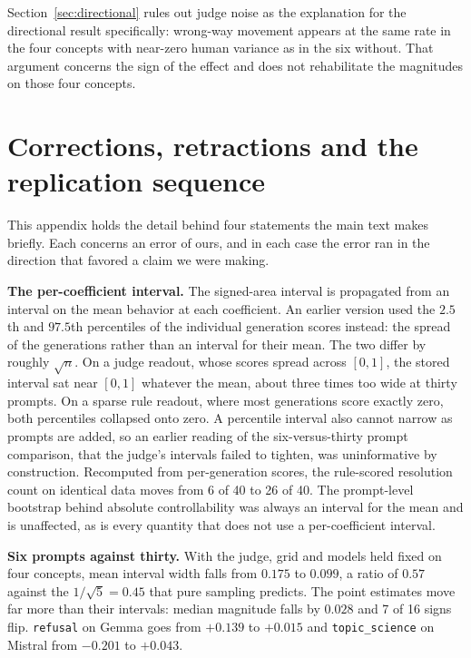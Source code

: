 \documentclass{article}
\begin{document}
Section~\ref{sec:directional} rules out judge noise as the explanation for the
directional result specifically: wrong-way movement appears at the same rate in
the four concepts with near-zero human variance as in the six without. That
argument concerns the sign of the effect and does not rehabilitate the
magnitudes on those four concepts.

\section{Corrections, retractions and the replication sequence}
\label{app:corrections}

This appendix holds the detail behind four statements the main text makes
briefly. Each concerns an error of ours, and in each case the error ran in the
direction that favored a claim we were making.

\textbf{The per-coefficient interval.} The signed-area interval is propagated
from an interval on the mean behavior at each coefficient. An earlier version
used the $2.5$th and $97.5$th percentiles of the individual generation scores
instead: the spread of the generations rather than an interval for their mean.
The two differ by roughly $\sqrt{n}$. On a judge readout, whose scores spread
across $[0,1]$, the stored interval sat near $[0,1]$ whatever the mean, about
three times too wide at thirty prompts. On a sparse rule readout, where most
generations score exactly zero, both percentiles collapsed onto zero. A
percentile interval also cannot narrow as prompts are added, so an earlier
reading of the six-versus-thirty prompt comparison, that the judge's intervals
failed to tighten, was uninformative by construction. Recomputed from
per-generation scores, the rule-scored resolution count on identical data moves
from 6 of 40 to 26 of 40. The prompt-level bootstrap behind absolute
controllability was always an interval for the mean and is unaffected, as is
every quantity that does not use a per-coefficient interval.

\textbf{Six prompts against thirty.} With the judge, grid and models held fixed
on four concepts, mean interval width falls from $0.175$ to $0.099$, a ratio of
$0.57$ against the $1/\sqrt{5} = 0.45$ that pure sampling predicts. The point
estimates move far more than their intervals: median magnitude falls by $0.028$
and 7 of 16 signs flip. \texttt{refusal} on Gemma goes from $+0.139$ to $+0.015$
and \texttt{topic\_science} on Mistral from $-0.201$ to $+0.043$.
\end{document}
